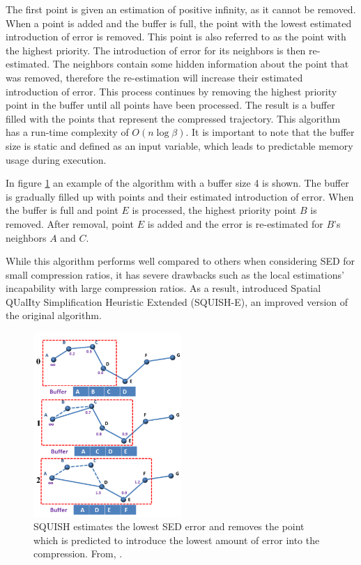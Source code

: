 The first point is given an estimation of positive infinity, as it cannot be removed. When a point is added and the buffer is full, the point with the lowest estimated introduction of error is removed. This point is also referred to as the point with the highest priority. The introduction of error for its neighbors is then re-estimated. The neighbors contain some hidden information about the point that was removed, therefore the re-estimation will increase their estimated introduction of error. This process continues by removing the highest priority point in the buffer until all points have been processed. The result is a buffer filled with the points that represent the compressed trajectory. This algorithm has a run-time complexity of $O(n\log{\beta})$. It is important to note that the buffer size is static and defined as an input variable, which leads to predictable memory usage during execution.

In figure \ref{fig:squish} an example of the algorithm with a buffer size 4 is shown. The buffer is gradually filled up with points and their estimated introduction of error. When the buffer is full and point $E$ is processed, the highest priority point $B$ is removed. After removal, point $E$ is added and the error is re-estimated for $B$'s neighbors $A$ and $C$.

While this algorithm performs well compared to others when considering SED for small compression ratios, it has severe drawbacks such as the local estimations' incapability with large compression ratios. As a result, \textcite{muckell2014compression} introduced Spatial QUalIty Simplification Heuristic Extended (SQUISH-E), an improved version of the original algorithm.

\begin{figure}
    \includegraphics[width=0.5\textwidth]{./figures/squish.png}
    \caption{SQUISH estimates the lowest SED error
        and removes the point which is predicted to introduce
        the lowest amount of error into the compression. From, \cite{muckell2011squish}.}
    \label{fig:squish}
\end{figure}

